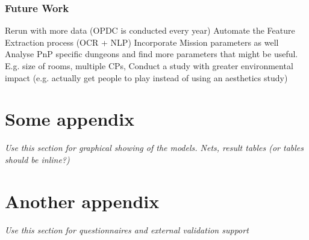 \documentclass{UoYCSproject}
\begin{document}
\subsection{Future Work}
\begin{outline}[enumerate]
  \1 Rerun with more data (OPDC is conducted every year)
  \1 Automate the Feature Extraction process (OCR + NLP)
  \1 Incorporate Mission parameters as well
  \1 Analyse PnP specific dungeons and find more parameters that might be useful. E.g. size of rooms, multiple CPs, 
  \1 Conduct a study with greater environmental impact (e.g. actually get people to play instead of using an aesthetics study)
\end{outline}


\appendix
\chapter{Some appendix}
\textit{Use this section for graphical showing of the models. Nets, result tables (or tables should be inline?)}

\chapter{Another appendix}
\textit{Use this section for questionnaires and external validation support}

\printbibliography
\end{document}
